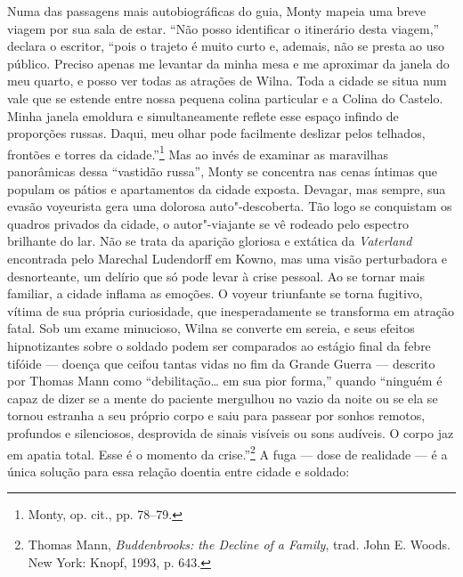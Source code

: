 Numa das passagens mais autobiográficas do guia, Monty mapeia uma breve
viagem por sua sala de estar. ``Não posso identificar o itinerário desta
viagem,'' declara o escritor, ``pois o trajeto é muito curto e, ademais,
não se presta ao uso público. Preciso apenas me levantar da minha mesa e
me aproximar da janela do meu quarto, e posso ver todas as atrações de
Wilna. Toda a cidade se situa num vale que se estende entre nossa
pequena colina particular e a Colina do Castelo. Minha janela emoldura e
simultaneamente reflete esse espaço infindo de proporções russas. Daqui,
meu olhar pode facilmente deslizar pelos telhados, frontões e torres da
cidade.''\footnote{Monty, op. cit., pp. 78--79.} Mas ao invés de examinar
as maravilhas panorâmicas dessa ``vastidão russa'', Monty se concentra
nas cenas íntimas que populam os pátios e apartamentos da cidade
exposta. Devagar, mas sempre, sua evasão voyeurista gera uma dolorosa
auto"-descoberta. Tão logo se conquistam os quadros privados da cidade, o
autor"-viajante se vê rodeado pelo espectro brilhante do lar. Não se
trata da aparição gloriosa e extática da \emph{Vaterland} encontrada
pelo Marechal Ludendorff em Kowno, mas uma visão perturbadora e
desnorteante, um delírio que só pode levar à crise pessoal. Ao se tornar
mais familiar, a cidade inflama as emoções. O voyeur triunfante se torna
fugitivo, vítima de sua própria curiosidade, que inesperadamente se
transforma em atração fatal. Sob um exame minucioso, Wilna se converte
em sereia, e seus efeitos hipnotizantes sobre o soldado podem ser
comparados ao estágio final da febre tifóide --- doença que ceifou tantas
vidas no fim da Grande Guerra --- descrito por Thomas Mann como
``debilitação\ldots{} em sua pior forma,'' quando ``ninguém é capaz de
dizer se a mente do paciente mergulhou no vazio da noite ou se ela se
tornou estranha a seu próprio corpo e saiu para passear por sonhos
remotos, profundos e silenciosos, desprovida de sinais visíveis ou sons
audíveis. O corpo jaz em apatia total. Esse é o momento da
crise.''\footnote{Thomas Mann, \emph{Buddenbrooks: the Decline of a
  Family}, trad. John E. Woods. New York: Knopf, 1993, p. 643.} A fuga ---
dose de realidade --- é a única solução para essa relação doentia entre
cidade e soldado:

